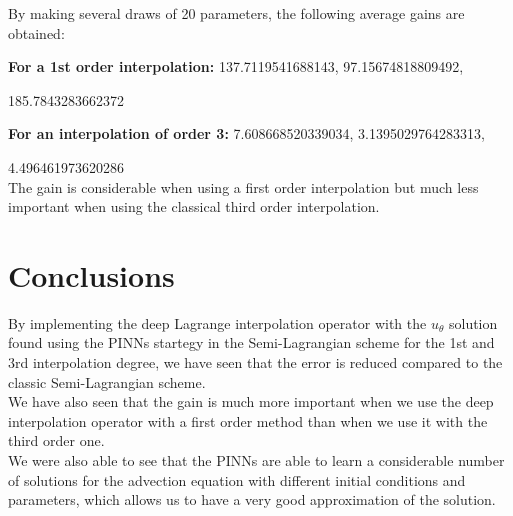\documentclass{article}
\begin{document}
By making several draws of 20 parameters, the following average gains are obtained:

\textbf{For a 1st order interpolation:} 137.7119541688143, 97.15674818809492,

185.7843283662372

\textbf{For an interpolation of order 3:} 7.608668520339034, 3.1395029764283313,

4.496461973620286 \\

The gain is considerable when using a first order interpolation but much less important when using the classical third order interpolation.

\newpage

\section{Conclusions}

By implementing the deep Lagrange interpolation operator with the $u_\theta$ solution found using the PINNs startegy in the Semi-Lagrangian scheme for the 1st and 3rd interpolation degree, we have seen that the error is reduced compared to the classic Semi-Lagrangian scheme.\\
We have also seen that the gain is much more important when we use the deep interpolation operator with a first order method than when we use it with the third order one.\\
We were also able to see that the PINNs are able to learn a considerable number of solutions for the advection equation with different initial conditions and
parameters, which allows us to have a very good approximation of the solution.\\

\newpage
\end{document}
